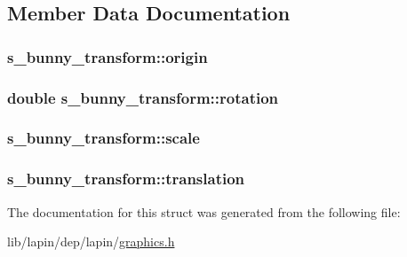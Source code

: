 \subsection{Member Data Documentation}
\hypertarget{structs__bunny__transform_af634ca8a6884a87587c198a5e2349ea7}{
\subsubsection[{origin}]{ s\-\_\-bunny\-\_\-transform\-::origin}}\label{structs__bunny__transform_af634ca8a6884a87587c198a5e2349ea7}
\hypertarget{structs__bunny__transform_a379c6a4255121e72469dc9ebda7e6aca}{
\subsubsection[{rotation}]{\setlength{\rightskip}{0pt plus 5cm}double s\-\_\-bunny\-\_\-transform\-::rotation}}\label{structs__bunny__transform_a379c6a4255121e72469dc9ebda7e6aca}
\hypertarget{structs__bunny__transform_aed85ef3b1defe3d9232722034440c897}{
\subsubsection[{scale}]{ s\-\_\-bunny\-\_\-transform\-::scale}}\label{structs__bunny__transform_aed85ef3b1defe3d9232722034440c897}
\hypertarget{structs__bunny__transform_ac6c9543979667fa2cbe281c4be273f6d}{
\subsubsection[{translation}]{ s\-\_\-bunny\-\_\-transform\-::translation}}\label{structs__bunny__transform_ac6c9543979667fa2cbe281c4be273f6d}


The documentation for this struct was generated from the following file\-:\begin{DoxyCompactItemize}
\item 
lib/lapin/dep/lapin/\hyperlink{graphics_8h}{graphics.\-h}\end{DoxyCompactItemize}
